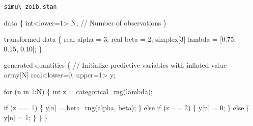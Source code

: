 \documentclass[
  letterpaper,
  DIV=11,
  numbers=noendperiod]{scrartcl}
\newenvironment{Shaded}{\begin{snugshade}}{\end{snugshade}}
\newcommand{\CommentTok}[1]{\textcolor[rgb]{0.37,0.37,0.37}{#1}}
\newcommand{\ControlFlowTok}[1]{\textcolor[rgb]{0.00,0.23,0.31}{#1}}
\newcommand{\DataTypeTok}[1]{\textcolor[rgb]{0.68,0.00,0.00}{#1}}
\newcommand{\DecValTok}[1]{\textcolor[rgb]{0.68,0.00,0.00}{#1}}
\newcommand{\FloatTok}[1]{\textcolor[rgb]{0.68,0.00,0.00}{#1}}
\newcommand{\KeywordTok}[1]{\textcolor[rgb]{0.00,0.23,0.31}{#1}}
\newcommand{\NormalTok}[1]{\textcolor[rgb]{0.00,0.23,0.31}{#1}}
\begin{document}
\begin{codelisting}

\caption{\texttt{simu\textbackslash\_zoib.stan}}

\begin{Shaded}
\begin{Highlighting}[]
\KeywordTok{data}\NormalTok{ \{}
  \DataTypeTok{int}\NormalTok{\textless{}}\KeywordTok{lower}\NormalTok{=}\DecValTok{1}\NormalTok{\textgreater{} N; }\CommentTok{// Number of observations}
\NormalTok{\}}

\KeywordTok{transformed data}\NormalTok{ \{}
  \DataTypeTok{real}\NormalTok{ alpha = }\DecValTok{3}\NormalTok{;}
  \DataTypeTok{real}\NormalTok{ beta = }\DecValTok{2}\NormalTok{;}
  \DataTypeTok{simplex}\NormalTok{[}\DecValTok{3}\NormalTok{] lambda = [}\FloatTok{0.75}\NormalTok{, }\FloatTok{0.15}\NormalTok{, }\FloatTok{0.10}\NormalTok{]\textquotesingle{};}
\NormalTok{\}}

\KeywordTok{generated quantities}\NormalTok{ \{}
  \CommentTok{// Initialize predictive variables with inflated value}
  \DataTypeTok{array}\NormalTok{[N] }\DataTypeTok{real}\NormalTok{\textless{}}\KeywordTok{lower}\NormalTok{=}\DecValTok{0}\NormalTok{, }\KeywordTok{upper}\NormalTok{=}\DecValTok{1}\NormalTok{\textgreater{} y;}

  \ControlFlowTok{for}\NormalTok{ (n }\ControlFlowTok{in} \DecValTok{1}\NormalTok{:N) \{}
    \DataTypeTok{int}\NormalTok{ z = categorical\_rng(lambda);}

    \ControlFlowTok{if}\NormalTok{ (z == }\DecValTok{1}\NormalTok{) \{}
\NormalTok{      y[n] = beta\_rng(alpha, beta);}
\NormalTok{    \} }\ControlFlowTok{else} \ControlFlowTok{if}\NormalTok{ (z == }\DecValTok{2}\NormalTok{) \{}
\NormalTok{      y[n] = }\DecValTok{0}\NormalTok{;}
\NormalTok{    \} }\ControlFlowTok{else}\NormalTok{ \{}
\NormalTok{      y[n] = }\DecValTok{1}\NormalTok{;}
\NormalTok{    \}}
\NormalTok{  \}}
\NormalTok{\}}
\end{Highlighting}
\end{Shaded}

\end{codelisting}
\end{document}
